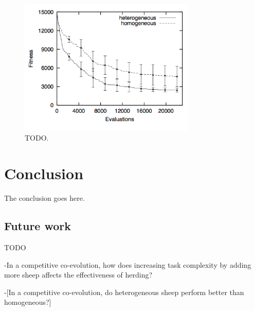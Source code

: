 \documentclass[conference]{IEEEtran}
\begin{document}
\begin{figure}[ht]
\centering
\includegraphics[width=3.3in]{imgs/homo_vs_hetero.png}
\caption{TODO.}
\label{fig:homo_vs_hetero}
\end{figure}

\section{Conclusion}
The conclusion goes here.

\subsection{Future work}
TODO

-In a competitive co-evolution, how does increasing task complexity by adding more sheep affects the effectiveness of herding? %

-[In a competitive co-evolution, do heterogeneous sheep perform better than homogeneous?] %





\end{document}

